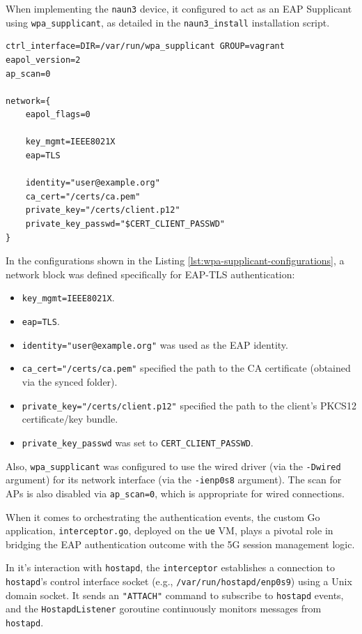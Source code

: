 When implementing the \texttt{naun3} device, it configured to act as an \ac{EAP} Supplicant using \texttt{wpa\_supplicant}, as detailed in the \texttt{naun3\_install} installation script.

\begin{lstlisting}[caption=\texttt{wpa\_supplicant} configurations,label={lst:wpa-supplicant-configurations}]
ctrl_interface=DIR=/var/run/wpa_supplicant GROUP=vagrant
eapol_version=2
ap_scan=0

network={
    eapol_flags=0

    key_mgmt=IEEE8021X
    eap=TLS

    identity="user@example.org"
    ca_cert="/certs/ca.pem"
    private_key="/certs/client.p12"
    private_key_passwd="$CERT_CLIENT_PASSWD"
}
\end{lstlisting}

In the configurations shown in the Listing \ref{lst:wpa-supplicant-configurations}, a network block was defined specifically for \ac{EAP-TLS} authentication:

\begin{itemize}
    \item \texttt{key\_mgmt=IEEE8021X}.
    \item \texttt{eap=TLS}.
    \item \texttt{identity="user@example.org"} was used as the \ac{EAP} identity.
    \item \texttt{ca\_cert="/certs/ca.pem"} specified the path to the \ac{CA} certificate (obtained via the synced folder).
    \item \texttt{private\_key="/certs/client.p12"} specified the path to the client's \ac{PKCS12} certificate/key bundle.
    \item \texttt{private\_key\_passwd} was set to \texttt{CERT\_CLIENT\_PASSWD}.
\end{itemize}

Also, \texttt{wpa\_supplicant} was configured to use the wired driver (via the \texttt{-Dwired} argument) for its network interface (via the \texttt{-ienp0s8} argument). The scan for \acp{AP} is also disabled via \texttt{ap\_scan=0}, which is appropriate for wired connections.

When it comes to orchestrating the authentication events, the custom Go application, \texttt{interceptor.go}, deployed on the \texttt{ue} \ac{VM}, plays a pivotal role in bridging the \ac{EAP} authentication outcome with the \ac{5G} session management logic.

In it's interaction with \texttt{hostapd}, the \texttt{interceptor} establishes a connection to \texttt{hostapd}'s control interface socket (e.g., \texttt{/var/run/hostapd/enp0s9}) using a Unix domain socket. It sends an \texttt{"ATTACH"} command to subscribe to \texttt{hostapd} events, and the \texttt{HostapdListener} goroutine continuously monitors messages from \texttt{hostapd}.

